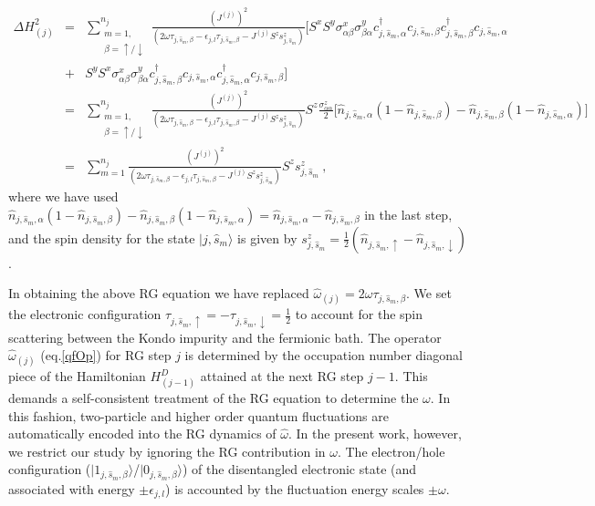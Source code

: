 \documentclass[aps,prb,preprint,groupedaddress]{revtex4-2}
\begin{document}
\begin{eqnarray}
\Delta H^{2}_{(j)}&=&\sum_{\substack{m=1,\\ \beta=\uparrow/\downarrow}}^{n_{j}}\frac{(J^{(j)})^{2}}{(2\omega\tau_{j,\hat{s}_{m},\beta} - \epsilon_{j,l}\tau_{j,\hat{s}_{m},\beta}-J^{(j)}S^{z}s^{z}_{j,\hat{s}_{m}})}\bigg[S^{x}S^{y}\sigma^{x}_{\alpha\beta}\sigma^{y}_{\beta\alpha}c^{\dagger}_{j,\hat{s}_{m},\alpha}c_{j,\hat{s}_{m},\beta}c^{\dagger}_{j,\hat{s}_{m},\beta}c_{j,\hat{s}_{m},\alpha}\nonumber\\
&+&S^{y}S^{x}\sigma^{x}_{\alpha\beta}\sigma^{y}_{\beta\alpha}c^{\dagger}_{j,\hat{s}_{m},\beta}c_{j,\hat{s}_{m},\alpha}c^{\dagger}_{j,\hat{s}_{m},\alpha}c_{j,\hat{s}_{m},\beta}\bigg]\nonumber\\
&=&\sum_{\substack{m=1,\\ \beta=\uparrow/\downarrow}}^{n_{j}}\frac{(J^{(j)})^{2}}{(2\omega\tau_{j,\hat{s}_{m},\beta} - \epsilon_{j,l}\tau_{j,\hat{s}_{m},\beta}-J^{(j)}S^{z}s^{z}_{j,\hat{s}_{m}})}S^{z}\frac{\sigma^{z}_{\alpha\alpha}}{2}\bigg[\hat{n}_{j,\hat{s}_{m},\alpha}(1-\hat{n}_{j,\hat{s}_{m},\beta})-\hat{n}_{j,\hat{s}_{m},\beta}(1-\hat{n}_{j,\hat{s}_{m},\alpha})\bigg]\nonumber\\
&=&\sum_{m=1}^{n_{j}}\frac{(J^{(j)})^{2}}{(2\omega\tau_{j,\hat{s}_{m},\beta} - \epsilon_{j,l}\tau_{j,\hat{s}_{m},\beta}-J^{(j)}S^{z}s^{z}_{j,\hat{s}_{m}})}S^{z}s^{z}_{j,\hat{s}_{m}}~,\label{minor}
\end{eqnarray}
where we have used $\hat{n}_{j,\hat{s}_{m},\alpha}(1-\hat{n}_{j,\hat{s}_{m},\beta})-\hat{n}_{j,\hat{s}_{m},\beta}(1-\hat{n}_{j,\hat{s}_{m},\alpha})=\hat{n}_{j,\hat{s}_{m},\alpha}-\hat{n}_{j,\hat{s}_{m},\beta}$  in the last step, and the spin density for the state $|j,\hat{s}_{m}\rangle$ is given by $s^{z}_{j,\hat{s}_{m}}=\frac{1}{2}(\hat{n}_{j,\hat{s}_{m},\uparrow}-\hat{n}_{j,\hat{s}_{m},\downarrow})$.
\par\noindent
In obtaining the above RG equation we have replaced  $\hat{\omega}_{(j)}=2\omega\tau_{j,\hat{s}_{m},\beta}$. We set the electronic configuration $\tau_{j,\hat{s}_{m},\uparrow}=-\tau_{j,\hat{s}_{m},\downarrow}=\frac{1}{2}$ to account for the spin scattering between the Kondo impurity and the fermionic bath.  The operator $\hat{\omega}_{(j)}$ (eq.\eqref{qfOp}) for RG step $j$ is determined by the occupation number diagonal piece of the Hamiltonian  $H^{D}_{(j-1)}$ attained at the next RG step $j-1$. This demands a self-consistent treatment of the RG equation to determine the $\omega$. In this fashion, two-particle and higher order quantum fluctuations are automatically encoded into the RG dynamics of $\hat{\omega}$. In the present work, however, we restrict our study by ignoring the RG contribution in $\omega$. The electron/hole configuration ($|1_{j,\hat{s}_{m},\beta}\rangle$/$|0_{j,\hat{s}_{m},\beta}\rangle$) of the disentangled electronic state (and associated with energy $\pm \epsilon_{j,l}$) is accounted by the fluctuation energy scales $\pm\omega$. 
\end{document}
